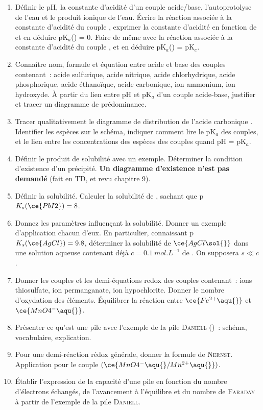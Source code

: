 \documentclass[a4paper, 12pt, final, garamond]{book}
\begin{document}
\begin{enumerate}[label=\sqenumi]
    \item Définir le pH, la constante d'acidité d'un couple acide/base,
        l'autoprotolyse de l'eau et le produit ionique de l'eau. Écrire la
        réaction associée à la constante d'acidité du couple ,
        exprimer la constante d'acidité en fonction de \ce{[H3O+]} et en déduire
        pK$_a$() = 0. Faire de même avec la réaction associée à la
        constante d'acidité du couple , et en déduire
        pK$_a$() = pK$_e$.
    \item Connaître nom, formule et équation entre acide et base des couples
        contenant~: acide sulfurique, acide nitrique, acide chlorhydrique, acide
        phosphorique, acide éthanoïque, acide carbonique, ion ammonium, ion
        hydroxyde. À partir du lien entre pH et pK$_a$ d'un couple acide-base,
        justifier et tracer un diagramme de prédominance.
    \item Tracer qualitativement le diagramme de distribution de l'acide
        carbonique . Identifier les espèces sur le schéma, indiquer
        comment lire le pK$_a$ des couples, et le lien entre les concentrations
        des espèces des couples quand pH = pK$_a$.

    \item Définir le produit de solubilité avec un exemple. Déterminer la
        condition d'existence d'un précipité. \textbf{Un diagramme d'existence
        n'est pas demandé} (fait en TD, et revu chapitre 9).
    \item Définir la solubilité. Calculer la solubilité de , sachant
        que p$K_s(\ce{PbI2}) = 8$.
    \item Donnez les paramètres influençant la solubilité. Donner un exemple
        d'application chacun d'eux. En particulier, connaissant p$K_s(\ce{AgCl})
        = 9.8$, déterminer la solubilité de $\ce{AgCl\sol{}}$ dans une solution
        aqueuse contenant déjà $c = \SI{0.1}{mol.L^{-1}}$ de . On
        supposera $s \ll c$.
    \item Donner les couples et les demi-équations redox des couples contenant~:
        ions thiosulfate, ion permanganate, ion hypochlorite. Donner le nombre
        d'oxydation des éléments. Équilibrer la réaction entre
        $\ce{Fe^{2+}\aqu{}}$ et $\ce{MnO4^-\aqu{}}$.
    \item Présenter ce qu'est une pile avec l'exemple de la pile
        \textsc{Daniell} ()~: schéma, vocabulaire, explication.
    \item Pour une demi-réaction rédox générale, donner la formule de
        \textsc{Nernst}. Application pour le couple
        $(\ce{MnO4^{-}\aqu{}/Mn^{2+}\aqu{}})$.
    \item Établir l'expression de la capacité d'une pile en fonction du nombre
        d'électrons échangés, de l'avancement à l'équilibre et du nombre de
        \textsc{Faraday} à partir de l'exemple de la pile \textsc{Daniell}.
\end{enumerate}
\vspace{-5pt}
\end{document}
